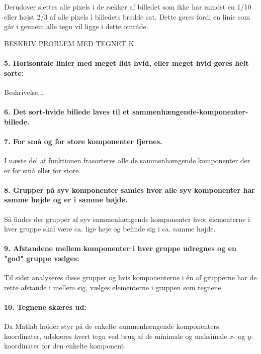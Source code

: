 Derudover slettes alle pixels i de rækker af billedet som ikke har mindst en 1/10 eller højst 2/3 af alle pixels i billedets bredde sat. Dette gøres fordi en linie som går i gennem alle tegn vil ligge i dette område.

BESKRIV PROBLEM MED TEGNET K

\paragraph{5. Horisontale linier med meget lidt hvid, eller meget hvid gøres helt sorte:}
Beskrivelse...

\paragraph{6. Det sort-hvide billede laves til et sammenhængende-komponenter-billede.}
\paragraph{7. For små og for store komponenter fjernes.}
I næste del af funktionen frasorteres alle de sammenhængende komponenter der er for små eller for store.

\paragraph{8. Grupper på syv komponenter samles hvor alle syv komponenter har samme højde og er i samme højde.}

Så findes der grupper af syv sammenhængende komponenter hvor elementerne i hver gruppe skal være ca. lige høje og befinde sig i ca. samme højde.

\paragraph{9. Afstandene mellem komponenter i hver gruppe udregnes og en "god" gruppe vælges:}
Til sidst analyseres disse grupper og hvis komponenterne i én af grupperne har de rette afstande i mellem sig, vælges elementerne i gruppen som tegnene.

\paragraph{10. Tegnene skæres ud:} Da Matlab holder styr på de enkelte sammenhængende komponenters koordinater, udskæres hvert tegn ved brug af de minimale og maksimale $x$- og $y$-koordinater for den enkelte komponent.

